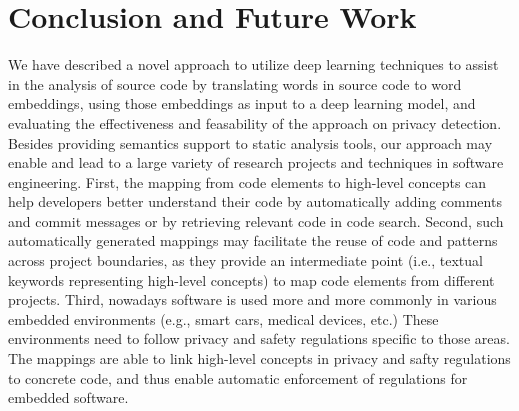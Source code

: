 \section{Conclusion and Future Work}

We have described a novel approach to utilize deep learning techniques to assist in the analysis of source code by translating words in source code to word embeddings, using those embeddings as input to a deep learning model, and evaluating the effectiveness and feasability of the approach on privacy detection. Besides providing semantics support to static analysis tools, our approach may enable and lead to a large variety of research projects and techniques in software engineering. First, the mapping from code elements to high-level concepts can help developers better understand their code by automatically adding comments and commit messages or by retrieving relevant code in code search. Second, such automatically generated mappings may facilitate the reuse of code and patterns across project boundaries, as they provide an intermediate point (i.e., textual keywords representing high-level concepts) to map code elements from different projects. Third, nowadays software is used more and more commonly in various embedded environments (e.g., smart cars, medical devices, etc.) These environments need to follow privacy and safety regulations specific to those areas. The mappings are able to link high-level concepts in privacy and safty regulations to concrete code, and thus enable automatic enforcement of regulations for embedded software.



